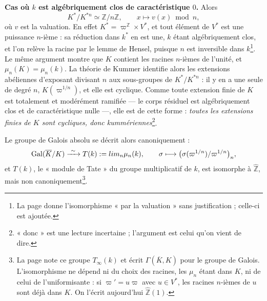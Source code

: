 \documentclass[11pt,a4paper]{article}
\begin{document}
\textbf{Cas où $k$ est algébriquement clos de caractéristique $0$.} Alors
\[
K^{*}/K^{*n} \simeq \mathbb{Z}/n\mathbb{Z}, \qquad x \longmapsto v(x) \bmod n,
\]
où $v$ est la valuation. En effet $K^{*} = \varpi^{\mathbb{Z}} \times V^{*}$, et
tout élément de $V^{*}$ est une puissance $n$-ième : sa réduction dans $k^{*}$
en est une, $k$ étant algébriquement clos, et l'on relève la racine par le
lemme de Hensel, puisque $n$ est inversible dans $k$\footnote{La page donne
l'isomorphisme « par la valuation » sans justification ; celle-ci est
ajoutée.}. Le même argument montre que $K$ contient les racines $n$-ièmes de
l'unité, et $\mu_n(K) = \mu_n(k)$. La théorie de Kummer identifie alors les
extensions abéliennes d'exposant divisant $n$ aux sous-groupes de
$K^{*}/K^{*n}$ : il y en a une seule de degré $n$, $K(\varpi^{1/n})$, et elle est
cyclique. Comme toute extension finie de $K$ est totalement et modérément
ramifiée — le corps résiduel est algébriquement clos et de caractéristique
nulle —, elle est de cette forme : \emph{toutes les extensions finies de $K$
sont cycliques, donc kummériennes}\footnote{« donc » est une lecture
incertaine ; l'argument est celui qu'on vient de dire.}.

Le groupe de Galois absolu se décrit alors canoniquement :
\[
\mathrm{Gal}(\overline{K}/K) \xrightarrow{\ \sim\ } T(k) := \varprojlim_n \mu_n(k),
\qquad \sigma \longmapsto \bigl(\sigma(\varpi^{1/n})/\varpi^{1/n}\bigr)_n ,
\]
et $T(k)$, le « module de Tate » du groupe multiplicatif de $k$, est isomorphe
à $\widehat{\mathbb{Z}}$, mais non canoniquement\footnote{La page note ce
groupe $T_\infty(k)$ et écrit $\Gamma(\overline{K}, K)$ pour le groupe de Galois.
L'isomorphisme ne dépend ni du choix des racines, les $\mu_n$ étant dans $K$, ni
de celui de l'uniformisante : si $\varpi' = u\varpi$ avec $u \in V^{*}$, les
racines $n$-ièmes de $u$ sont déjà dans $K$. On l'écrit aujourd'hui
$\widehat{\mathbb{Z}}(1)$.}.
\end{document}
